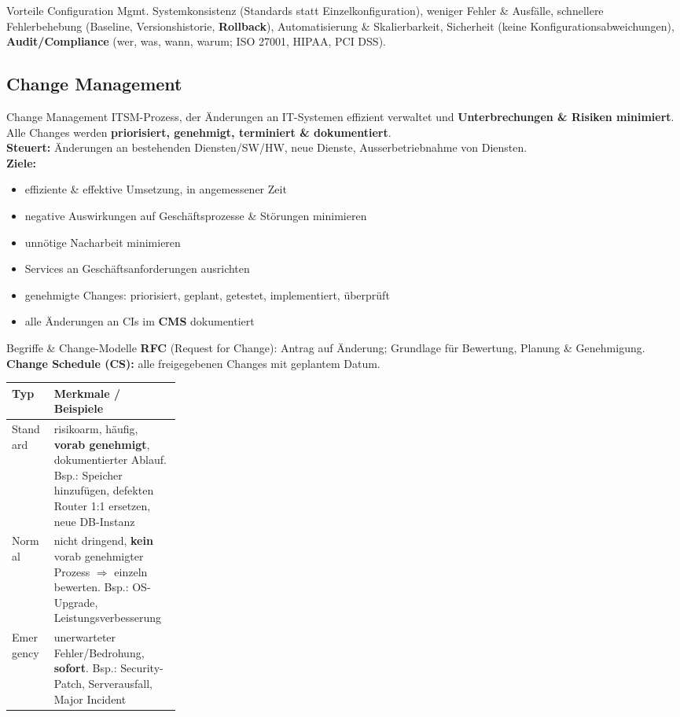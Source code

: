 \documentclass[a4paper, fontsize=7pt]{scrartcl}
\renewcommand*{\arraystretch}{1.5}  %
\begin{document}
\begin{subbox}{Vorteile Configuration Mgmt.}
Systemkonsistenz (Standards statt Einzelkonfiguration), weniger Fehler \&
Ausfälle, schnellere Fehlerbehebung (Baseline, Versionshistorie,
\textbf{Rollback}), Automatisierung \& Skalierbarkeit, Sicherheit (keine
Konfigurationsabweichungen), \textbf{Audit/Compliance} (wer, was, wann, warum;
ISO 27001, HIPAA, PCI DSS).
\end{subbox}

\subsection{Change Management}

\begin{mainbox}{Change Management}
ITSM-Prozess, der Änderungen an IT-Systemen effizient verwaltet und
\textbf{Unterbrechungen \& Risiken minimiert}. Alle Changes werden
\textbf{priorisiert, genehmigt, terminiert \& dokumentiert}.\\
\textbf{Steuert:} Änderungen an bestehenden Diensten/SW/HW, neue Dienste,
Ausserbetriebnahme von Diensten.\\
\textbf{Ziele:}
\begin{itemize}
    \item effiziente \& effektive Umsetzung, in angemessener Zeit
    \item negative Auswirkungen auf Geschäftsprozesse \& Störungen minimieren
    \item unnötige Nacharbeit minimieren
    \item Services an Geschäftsanforderungen ausrichten
    \item genehmigte Changes: priorisiert, geplant, getestet, implementiert,
          überprüft
    \item alle Änderungen an CIs im \textbf{CMS} dokumentiert
\end{itemize}
\end{mainbox}

\begin{mainbox}{Begriffe \& Change-Modelle}
\textbf{RFC} (Request for Change): Antrag auf Änderung; Grundlage für
Bewertung, Planung \& Genehmigung.\\
\textbf{Change Schedule (CS):} alle freigegebenen Changes mit geplantem
Datum.
\renewcommand*{\arraystretch}{1.15}
\begin{tabularx}{\linewidth}{@{}>{\raggedright\arraybackslash}p{0.25\linewidth}|>{\raggedright\arraybackslash}X@{}}
\textbf{Typ} & \textbf{Merkmale / Beispiele} \\
\hline
Standard & risikoarm, häufig, \textbf{vorab genehmigt}, dokumentierter Ablauf.
  Bsp.: Speicher hinzufügen, defekten Router 1:1 ersetzen, neue DB-Instanz \\
Normal & nicht dringend, \textbf{kein} vorab genehmigter Prozess
  $\Rightarrow$ einzeln bewerten. Bsp.: OS-Upgrade,
  Leistungsverbesserung \\
Emergency & unerwarteter Fehler/Bedrohung, \textbf{sofort}. Bsp.:
  Security-Patch, Serverausfall, Major Incident \\
\end{tabularx}
\end{mainbox}
\end{document}
